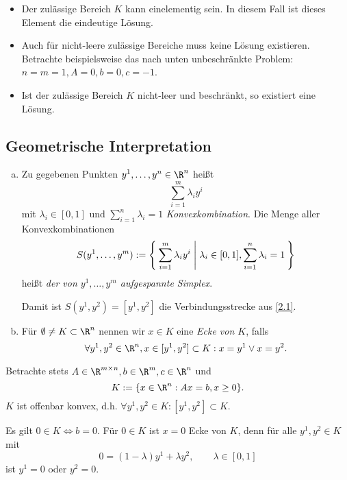 \begin{nt} \label{3.2}
	\begin{itemize}
		\item
			Der zulässige Bereich $K$ kann einelementig sein.
			In diesem Fall ist dieses Element die eindeutige Lösung.
		\item
			Auch für nicht-leere zulässige Bereiche muss keine Lösung existieren.
			Betrachte beispielsweise das nach unten unbeschränkte Problem: $n=m=1, A = 0, b=0, c=-1$.
		\item
			Ist der zulässige Bereich $K$ nicht-leer und beschränkt, so existiert eine Lösung.
	\end{itemize}
\end{nt}

\subsection{Geometrische Interpretation}

\begin{df} \label{3.3}
	\begin{enumerate}[(a)]
		\item
			Zu gegebenen Punkten $y^1, \dotsc, y^n \in \R^n$ heißt
			\[
				\sum_{i=1}^m \lambda_i y^i
			\]
			mit $\lambda_i \in [0,1]$ und $\sum_{i=1}^n \lambda_i = 1$ \emph{Konvexkombination}.
			Die Menge aller Konvexkombinationen
			\[
				S(y^1, \dotsc, y^m) := \Set{
					\sum_{i=1}^m \lambda_i y^i |
					\lambda_i \in [0,1], \sum_{i=1}^n \lambda_i = 1
				}
			\]
			heißt \emph{der von $y^1,\dotsc, y^m$ aufgespannte Simplex}.

			\begin{note}
				Damit ist $S(y^1, y^2) = [y^1, y^2]$ die Verbindungsstrecke aus \ref{2.1}.
			\end{note}
		\item
			Für $\emptyset \neq K \subset \R^n$ nennen wir $x \in K$ eine \emph{Ecke von $K$}, falls
			\[
				\forall y^1, y^2 \in \R^n, x \in [y^1, y^2] \subset K : x = y^1 \lor x = y^2.
			\]
	\end{enumerate}
\end{df}

Betrachte stets $A \in \R^{m\times n}, b\in \R^m, c \in \R^n$ und
\[
	K:= \{ x \in \R^n : Ax = b, x \ge 0 \}.
\]
$K$ ist offenbar konvex, d.h. $\forall y^1, y^2 \in K : [y^1, y^2] \subset K$.

\begin{ex} \label{3.4}
	Es gilt $0 \in K \iff b = 0$.
	Für $0 \in K$ ist $x = 0$ Ecke von $K$, denn für alle $y^1, y^2 \in K$ mit
	\[
		0 = (1-\lambda) y^1 + \lambda y^2,
		\qquad \lambda \in [0,1]
	\]
	ist $y^1 = 0$ oder $y^2 = 0$.
\end{ex}

